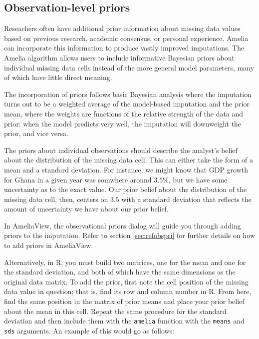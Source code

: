 \documentclass[12pt,titlepage]{article}
\begin{document}
\subsection{Observation-level priors}
\label{sec:obspri}

Reseachers often have additional prior information about missing data 
values based on previous research, academic consensus, or personal 
experience.  Amelia can incorporate this information to produce vastly 
improved imputations.  The Amelia algorithm allows users to include 
informative Bayesian priors about individual missing data cells 
instead of the more general model parameters, many of which have 
little direct meaning.  

The incorporation of priors follows basic Bayesian analysis where the 
imputation turns out to be a weighted average of the model-based 
imputation and the prior mean, where the weights are functions of the 
relative strength of the data and prior: when the model predicts very 
well, the imputation will downweight the prior, and vice versa.  

The priors about individual observations should describe the analyst's 
belief about the distribution of the missing data cell.  This can either 
take the form of a mean and a standard deviation.  For instance, we 
might know that GDP growth for Ghana in a given year was somwhere 
around $3.5\%$, but we have some uncertainty as to the exact value.   
Our prior belief about the distribution of the missing data cell, then, 
centers on $3.5$ with a standard deviation that reflects the amount of 
uncertainty we have about our prior belief. 

In AmeliaView, the observational priors dialog will guide you through 
adding priors to the imputation.  Refer to section \ref{sec:refobspri} for 
further details on how to add priors in AmeliaView.

Alternatively, in R, you must build two matrices, one for the mean and
one for the standard deviation, and both of which have the same
dimensions as the original data matrix.  To add the prior, first note
the cell position of the missing data value in question; that is, find
its row and column number in R.  From here, find the same position in
the matrix of prior means and place your prior belief about the mean
in this cell.  Repeat the same procedure for the standard deviation
and then include them with the \texttt{amelia} function with the
\texttt{means} and \texttt{sds} arguments.  An example of this would
go as follows:
\end{document}
